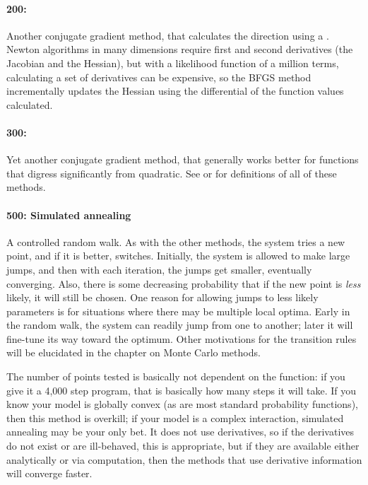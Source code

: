\paragraph{200: }  Another conjugate gradient method, that calculates the
direction using a . Newton algorithms
in many dimensions require first and second derivatives (the Jacobian
and the Hessian), but with a likelihood function of a million terms,
calculating a set of derivatives can be expensive, so the BFGS method
incrementally updates the Hessian using the differential of the function
values calculated.

\paragraph{300: } Yet another
conjugate gradient method, that generally works better for functions
that digress significantly from quadratic.  See \citet[thorough, mathematician audience]{avriel:nonlinear}
or \citet[practical, modeling audience]{practical:optimization}  for definitions of all of these methods.

\paragraph{500: Simulated annealing} A controlled random walk.
As with the other methods, the system tries a new point, and if it
is better, switches. Initially, the system is allowed to make large
jumps, and then with each iteration, the jumps get smaller, eventually
converging. Also, there is some decreasing probability that if the new
point is {\em less} likely, it will still be chosen. One reason for
allowing jumps to less likely parameters is for
situations where there may be multiple local optima. Early
in the random walk, the system can readily jump from one to another;
later it will fine-tune its way toward the optimum. Other motivations
for the transition rules will be elucidated in the chapter on Monte
Carlo methods.

The number of points tested is basically not dependent on the function:
if you give it a 4,000 step program, that is basically how many steps
it will take.  If you know your model is globally convex (as are most
standard probability functions), then this method is overkill; if your
model is a complex interaction, simulated annealing may be your only
bet. It does not use derivatives, so if the derivatives do not exist or
are ill-behaved, this is appropriate, but if they are available either
analytically or via computation, then the methods that use derivative
information will converge faster.

